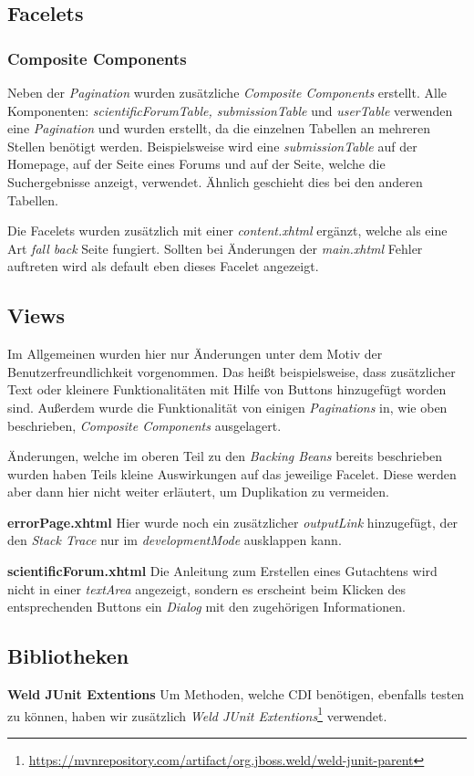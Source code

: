 \subsection{Facelets}

\subsubsection{Composite Components}

Neben der \emph{Pagination} wurden zusätzliche \emph{Composite Components} erstellt. Alle Komponenten: \emph{scientificForumTable, submissionTable} und \emph{userTable} verwenden eine \emph{Pagination} und wurden erstellt, da die einzelnen Tabellen an mehreren Stellen benötigt werden. Beispielsweise wird eine \emph{submissionTable} auf der Homepage, auf der Seite eines Forums und auf der Seite, welche die Suchergebnisse anzeigt, verwendet. Ähnlich geschieht dies bei den anderen Tabellen.

Die Facelets wurden zusätzlich mit einer \emph{content.xhtml} ergänzt, welche als eine Art \emph{fall back} Seite fungiert. Sollten bei Änderungen der \emph{main.xhtml} Fehler auftreten wird als default eben dieses Facelet angezeigt.

\subsection{Views}

Im Allgemeinen wurden hier nur Änderungen unter dem Motiv der Benutzerfreundlichkeit vorgenommen. Das heißt beispielsweise, dass zusätzlicher Text oder kleinere Funktionalitäten mit Hilfe von Buttons hinzugefügt worden sind. Außerdem wurde die Funktionalität von einigen \emph{Paginations} in, wie oben beschrieben, \emph{Composite Components} ausgelagert.

Änderungen, welche im oberen Teil zu den \emph{Backing Beans} bereits beschrieben wurden haben Teils kleine Auswirkungen auf das jeweilige Facelet. Diese werden aber dann hier nicht weiter erläutert, um Duplikation zu vermeiden.

\textbf{errorPage.xhtml} Hier wurde noch ein zusätzlicher \emph{outputLink} hinzugefügt, der den \emph{Stack Trace} nur im \emph{developmentMode} ausklappen kann.

\textbf{scientificForum.xhtml} Die Anleitung zum Erstellen eines Gutachtens wird nicht in einer \emph{textArea} angezeigt, sondern es erscheint beim Klicken des entsprechenden Buttons ein \emph{Dialog} mit den zugehörigen Informationen.

\subsection{Bibliotheken}

\textbf{Weld JUnit Extentions} Um Methoden, welche CDI benötigen, ebenfalls testen zu können, haben wir zusätzlich \emph{Weld JUnit Extentions}\footnote{\url{https://mvnrepository.com/artifact/org.jboss.weld/weld-junit-parent}} verwendet.
